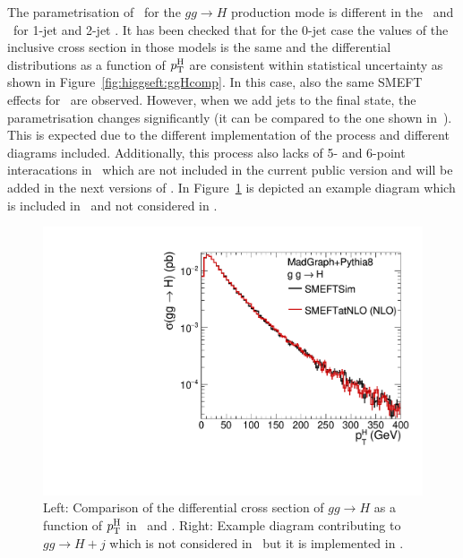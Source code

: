         
The parametrisation of \cpG\ for the $gg\to H$ production mode is different in the \SMEFTsim\ and \SMEFTatNLO\ for 1-jet and 2-jet . It has been checked that for the 0-jet case the values of the inclusive cross section in those models is the same and the differential distributions as a function of $p_{\textrm T}^{ \textrm H}$ are consistent within statistical uncertainty as shown in Figure~\ref{fig:higgseft:ggHcomp}. In this case, also the same SMEFT effects for \cpG\ are observed.
However, when we add jets to the final state, the parametrisation changes significantly (it can be compared to the one shown in~\cite{ATL-PHYS-PUB-2019-042}). This is expected due to the different implementation of the process and different diagrams included. Additionally, this process also lacks of 5- and 6-point interacations in \SMEFTsim\ which are not included in the current public version and will be added in the next versions of \SMEFTsim. In Figure~\ref{fig:higgseft:diagram} is depicted an example diagram which is included in \SMEFTatNLO\ and not considered in \SMEFTsim.

\begin{figure}
  
  \includegraphics[width=0.49\linewidth]{figures/pT_Higgs.pdf}
    \caption{ Left: Comparison of the differential cross section of  $gg\to H$ as a function of $p_{\textrm T}^{ \textrm H}$ in \SMEFTsim\ and \SMEFTatNLO. Right: Example diagram contributing to $gg\to H +j$ which is not considered in \SMEFTsim\ but it is implemented in \SMEFTatNLO.}
    \label{fig:higgseft:diagram}
\end{figure}

